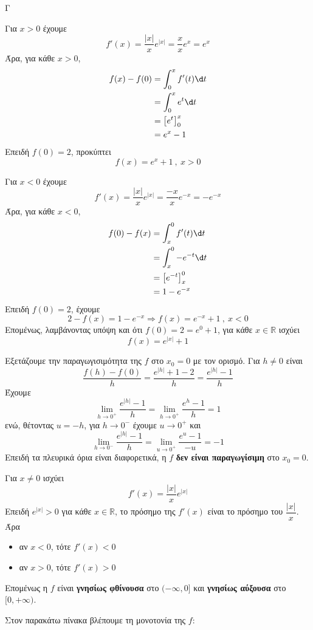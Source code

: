 \begin{thema}{Γ}
\begin{erwthma}
\item Για $x>0$ έχουμε
\[f'(x)=\frac{|x|}{x}e^{|x|}=\frac{x}{x}e^x=e^x\]
Άρα, για κάθε $x>0$,
\begin{align*}
f(x)-f(0)&=\dint_0^x f'(t)\d t\\
&=\dint_0^x e^t\d t\\
&=\left[e^t\right]_0^x\\
&=e^x-1
\end{align*}
Επειδή $f(0)=2$, προκύπτει
\[f(x)=e^x+1\ ,\ x>0\]

Για $x<0$ έχουμε
\[f'(x)=\frac{|x|}{x}e^{|x|}=\frac{-x}{x}e^{-x}=-e^{-x}\]
Άρα, για κάθε $x<0$,
\begin{align*}
f(0)-f(x)&=\dint_x^0 f'(t)\d t\\
&=\dint_x^0 -e^{-t}\d t\\
&=\left[e^{-t}\right]_x^0\\
&=1-e^{-x}
\end{align*}
Επειδή $f(0)=2$, έχουμε
\[2-f(x)=1-e^{-x}\Rightarrow f(x)=e^{-x}+1\ ,\ x<0\]
Επομένως, λαμβάνοντας υπόψη και ότι $f(0)=2=e^0+1$, για κάθε $x\in\mathbb{R}$ ισχύει
\[f(x)=e^{|x|}+1\]

\item Εξετάζουμε την παραγωγισιμότητα της $f$ στο $x_0=0$ με τον ορισμό.
Για $h\neq 0$ είναι
\[\frac{f(h)-f(0)}{h}=\frac{e^{|h|}+1-2}{h}=\frac{e^{|h|}-1}{h}\]
Έχουμε
\[\lim\limits_{h\to 0^+}\frac{e^{|h|}-1}{h}=\lim\limits_{h\to 0^+}\frac{e^h-1}{h}=1\]
ενώ, θέτοντας $u=-h$, για $h\to 0^-$ έχουμε $u\to 0^+$ και
\[\lim\limits_{h\to 0^-}\frac{e^{|h|}-1}{h}=\lim\limits_{u\to 0^+}\frac{e^u-1}{-u}=-1\]
Επειδή τα πλευρικά όρια είναι διαφορετικά, η $f$ \textbf{δεν είναι παραγωγίσιμη} στο $x_0=0$.

\item Για $x\neq 0$ ισχύει
\[f'(x)=\frac{|x|}{x}e^{|x|}\]
Επειδή $e^{|x|}>0$ για κάθε $x\in\mathbb{R}$, το πρόσημο της $f'(x)$ είναι το πρόσημο του $\dfrac{|x|}{x}$.
Άρα
\begin{itemize}
\item αν $x<0$, τότε $f'(x)<0$
\item αν $x>0$, τότε $f'(x)>0$
\end{itemize}
Επομένως η $f$ είναι \textbf{γνησίως φθίνουσα} στο $(-\infty,0]$ και \textbf{γνησίως αύξουσα} στο $[0,+\infty)$.

Στον παρακάτω πίνακα βλέπουμε τη μονοτονία της $f$:
\begin{center}
\end{center}


\end{erwthma}
\end{thema}
